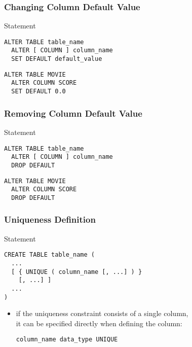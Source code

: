 \documentclass[dvipsnames]{beamer}
\theoremstyle{plain}
\begin{document}
\begin{frame}[fragile]
  \frametitle{Changing Column Default Value}

  \begin{block}{Statement}
    \begin{lstlisting}
ALTER TABLE table_name
  ALTER [ COLUMN ] column_name
  SET DEFAULT default_value
    \end{lstlisting}
  \end{block}

  \pause
  \medskip
  \begin{example}
    \begin{lstlisting}
ALTER TABLE MOVIE
  ALTER COLUMN SCORE
  SET DEFAULT 0.0
    \end{lstlisting}
  \end{example}
\end{frame}

\begin{frame}[fragile]
  \frametitle{Removing Column Default Value}

  \begin{block}{Statement}
    \begin{lstlisting}
ALTER TABLE table_name
  ALTER [ COLUMN ] column_name
  DROP DEFAULT
    \end{lstlisting}
  \end{block}

  \pause
  \medskip
  \begin{example}
    \begin{lstlisting}
ALTER TABLE MOVIE
  ALTER COLUMN SCORE
  DROP DEFAULT
    \end{lstlisting}
  \end{example}
\end{frame}

\begin{frame}[fragile]
  \frametitle{Uniqueness Definition}

  \begin{block}{Statement}
    \begin{lstlisting}
CREATE TABLE table_name (
  ...
  [ { UNIQUE ( column_name [, ...] ) }
    [, ...] ]
  ...
)
    \end{lstlisting}
  \end{block}

  \pause
  \begin{itemize}
    \item if the uniqueness constraint consists of a single column,\\
      it can be specified directly when defining the column:
      \begin{lstlisting}
column_name data_type UNIQUE
      \end{lstlisting}
  \end{itemize}
\end{frame}
\end{document}

